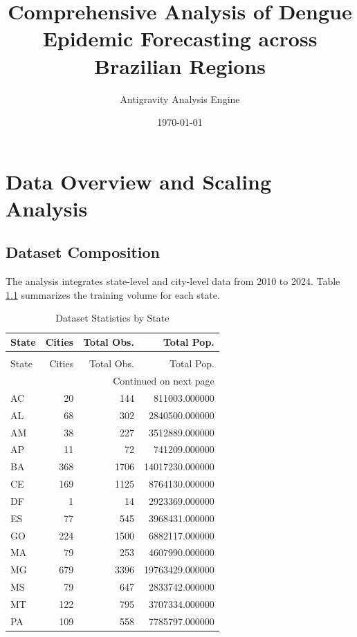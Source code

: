 \documentclass{report}
\title{Comprehensive Analysis of Dengue Epidemic Forecasting across Brazilian Regions}
\author{Antigravity Analysis Engine}
\date{\today}
\begin{document}
\maketitle

\chapter{Data Overview and Scaling Analysis}

\section{Dataset Composition}
The analysis integrates state-level and city-level data from 2010 to 2024. Table \ref{tab:dataset_stats} summarizes the training volume for each state.

\begin{center}
\begingroup
\renewcommand{\arraystretch}{1.1}
\begin{longtable}{lrrr}
\caption{Dataset Statistics by State} \label{tab:dataset_stats} \\
\toprule
State & Cities & Total Obs. & Total Pop. \\
\midrule
\endfirsthead
\caption[]{Dataset Statistics by State} \\
\toprule
State & Cities & Total Obs. & Total Pop. \\
\midrule
\endhead
\midrule
\multicolumn{4}{r}{Continued on next page} \\
\midrule
\endfoot
\bottomrule
\endlastfoot
AC & 20 & 144 & 811003.000000 \\
AL & 68 & 302 & 2840500.000000 \\
AM & 38 & 227 & 3512889.000000 \\
AP & 11 & 72 & 741209.000000 \\
BA & 368 & 1706 & 14017230.000000 \\
CE & 169 & 1125 & 8764130.000000 \\
DF & 1 & 14 & 2923369.000000 \\
ES & 77 & 545 & 3968431.000000 \\
GO & 224 & 1500 & 6882117.000000 \\
MA & 79 & 253 & 4607990.000000 \\
MG & 679 & 3396 & 19763429.000000 \\
MS & 79 & 647 & 2833742.000000 \\
MT & 122 & 795 & 3707334.000000 \\
PA & 109 & 558 & 7785797.000000 \\

\end{longtable}
\end{center}
\end{document}
